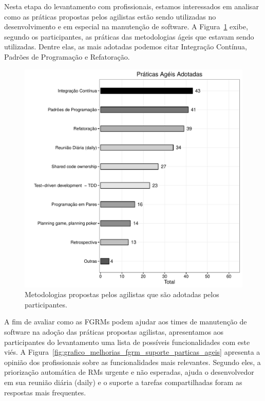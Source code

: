 Nesta etapa do levantamento com profissionais, estamos interessados em analisar
como as práticas propostas pelos agilistas estão sendo utilizadas no
desenvolvimento e em especial na manutenção de software. A
Figura~\ref{fig:grafico_melhorias_fgrm_praticas_ageis_adotadas} exibe, segundo
os participantes, as práticas das metodologias ágeis que estavam sendo
utilizadas. Dentre elas, as mais adotadas podemos citar Integração Contínua,
Padrões de Programação e Refatoração.

\begin{figure}[htpb]
	\centering
	\includegraphics[width=0.6\linewidth]{./chapter-pesquisa-com-profissionais/img/grafico_melhorias_fgrm_praticas_ageis_adotadas.pdf}
	\caption{Metodologias propostas pelos agilistas que são adotadas pelos
		participantes.}
\label{fig:grafico_melhorias_fgrm_praticas_ageis_adotadas}
\end{figure}

A fim de avaliar como as FGRMs podem ajudar aos times de manutenção de software
na adoção das práticas propostas agilistas, apresentamos aos participantes do
levantamento uma lista de possíveis funcionalidades com este viés. A
Figura~\ref{fig:grafico_melhorias_fgrm_suporte_particas_ageis} apresenta a
opinião dos profissionais sobre as funcionalidades mais relevantes. Segundo
eles, a priorização automática de RMs urgente e não esperadas, ajuda o
desenvolvedor em sua reunião diária (daily) e o suporte a tarefas compartilhadas
foram as respostas mais frequentes.

\todoend{}


